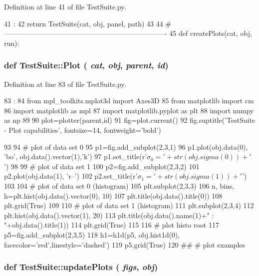 Definition at line 41 of file TestSuite.py.


\begin{DoxyCode}
41                                 :
42     return TestSuite(cat, obj, panel, path)
43 
44 #----------------------------------------------------------------------
45 
def createPlots(cat, obj, run):
\end{DoxyCode}
\hypertarget{namespaceTestSuite_a2e449c6ed170543941b00b002ea87bf6}{
\subsubsection[{Plot}]{\setlength{\rightskip}{0pt plus 5cm}def TestSuite::Plot ( {\em cat}, \/   {\em obj}, \/   {\em parent}, \/   {\em id})}}
\label{namespaceTestSuite_a2e449c6ed170543941b00b002ea87bf6}


Definition at line 83 of file TestSuite.py.


\begin{DoxyCode}
83                               :
84     from mpl_toolkits.mplot3d import Axes3D
85     from matplotlib import cm
86     import matplotlib as mpl
87     import matplotlib.pyplot as plt
88     import numpy as np
89 
90     plot=plotter(parent,id)
91     fig=plot.current()
92     fig.suptitle('TestSuite - Plot capabilities', fontsize=14, fontweight='bold')
      
93     
94     # plot of data set 0
95     p1=fig.add_subplot(2,3,1)
96     p1.plot(obj.data(0), 'bo', obj.data().vector(1),'k')
97     p1.set_title(r'$\sigma_0='+str(obj.sigma(0))+'$')
98     
99     # plot of data set 1
100     p2=fig.add_subplot(2,3,2)
101     p2.plot(obj.data(1), 'r--')
102     p2.set_title(r'$\sigma_1='+str(obj.sigma(1))+'$')
103     
104     # plot of data set 0 (histogram)
105     plt.subplot(2,3,3)
106     n, bins, h=plt.hist(obj.data().vector(0), 10)
107     plt.title(obj.data().title(0))    
108     plt.grid(True)
109 
110     # plot of data set 1 (histogram)    
111     plt.subplot(2,3,4)
112     plt.hist(obj.data().vector(1), 20)
113     plt.title(obj.data().name(1)+" : "+obj.data().title(1))
114     plt.grid(True)
115 
116     # plot histo root
117     p5=fig.add_subplot(2,3,5)
118     h1=h1d(p5, obj.hist1d(0), facecolor='red',linestyle='dashed')
119     p5.grid(True)
120 
##     # plot examples
\end{DoxyCode}
\hypertarget{namespaceTestSuite_a96c7c1a8754556cdab5561c25f693f3c}{
\subsubsection[{updatePlots}]{\setlength{\rightskip}{0pt plus 5cm}def TestSuite::updatePlots ( {\em figs}, \/   {\em obj})}}
\label{namespaceTestSuite_a96c7c1a8754556cdab5561c25f693f3c}


